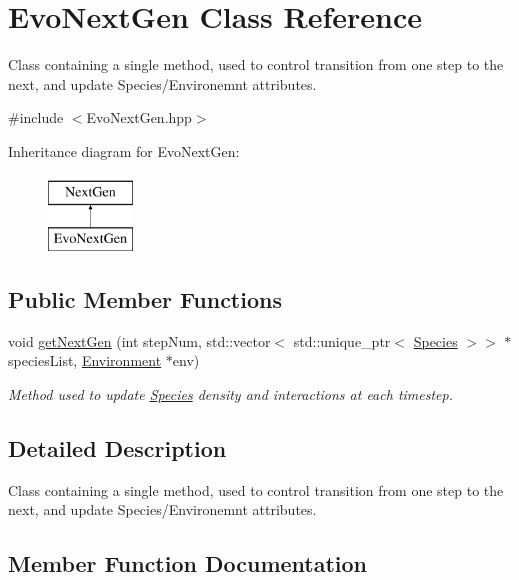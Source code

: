 \hypertarget{classEvoNextGen}{}\section{Evo\+Next\+Gen Class Reference}
\label{classEvoNextGen}


Class containing a single method, used to control transition from one step to the next, and update Species/\+Environemnt attributes.  




{\ttfamily \#include $<$Evo\+Next\+Gen.\+hpp$>$}

Inheritance diagram for Evo\+Next\+Gen\+:\begin{figure}[H]
\begin{center}
\leavevmode
\includegraphics[height=2.000000cm]{classEvoNextGen}
\end{center}
\end{figure}
\subsection*{Public Member Functions}
\begin{DoxyCompactItemize}
\item 
void \hyperlink{classEvoNextGen_af9ee37c63b6b2c22d27194b6b507c75a}{get\+Next\+Gen} (int step\+Num, std\+::vector$<$ std\+::unique\+\_\+ptr$<$ \hyperlink{classSpecies}{Species} $>$$>$ $\ast$species\+List, \hyperlink{classEnvironment}{Environment} $\ast$env)
\begin{DoxyCompactList}\small\item\em Method used to update \hyperlink{classSpecies}{Species} density and interactions at each timestep. \end{DoxyCompactList}\end{DoxyCompactItemize}


\subsection{Detailed Description}
Class containing a single method, used to control transition from one step to the next, and update Species/\+Environemnt attributes. 

\subsection{Member Function Documentation}
\mbox{\label{classEvoNextGen_af9ee37c63b6b2c22d27194b6b507c75a}} 
